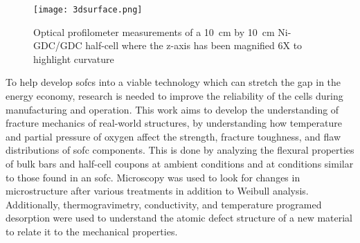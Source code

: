     \begin{figure}
      \centering
      \texttt{[image: 3dsurface.png]}
      \caption{Optical profilometer measurements of a \SI{10}{\centi\meter} by \SI{10}{\centi\meter} Ni-GDC/GDC half-cell where the z-axis has been magnified 6X to highlight curvature}\label{fig:flatness}
    \end{figure}



    To help develop \glspl{sofc} into a viable technology which can stretch the gap in the energy economy, research is needed to improve the reliability of the cells during manufacturing and operation.
    This work aims to develop the understanding of fracture mechanics of real-world structures, by understanding how temperature and partial pressure of oxygen affect the strength, fracture toughness, and flaw distributions of \gls{sofc} components.
    This is done by analyzing the flexural properties of bulk bars and half-cell coupons at ambient conditions and at conditions similar to those found in an \gls{sofc}.
    Microscopy was used to look for changes in microstructure after various treatments in addition to Weibull analysis.
    Additionally, thermogravimetry, conductivity, and temperature programed desorption were used to understand the atomic defect structure of a new material to relate it to the mechanical properties.

